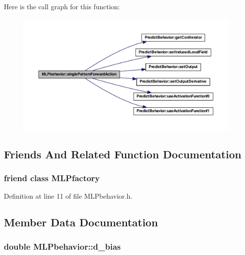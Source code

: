 Here is the call graph for this function:\nopagebreak
\begin{figure}[H]
\begin{center}
\leavevmode
\includegraphics[width=400pt]{class_m_l_pbehavior_a2f91bc3f2e558b92f5beb5e45402e6c7_cgraph}
\end{center}
\end{figure}




\subsection{Friends And Related Function Documentation}
\hypertarget{class_m_l_pbehavior_a1aa48940238b9487734e590ffab33a1b}{
\subsubsection[{MLPfactory}]{\setlength{\rightskip}{0pt plus 5cm}friend class {\bf MLPfactory}}}
\label{class_m_l_pbehavior_a1aa48940238b9487734e590ffab33a1b}


Definition at line 11 of file MLPbehavior.h.



\subsection{Member Data Documentation}
\hypertarget{class_m_l_pbehavior_a6206785c5c3f838a0538f9f77fa7a25a}{
\subsubsection[{d\_\-bias}]{\setlength{\rightskip}{0pt plus 5cm}double {\bf MLPbehavior::d\_\-bias}}}
\label{class_m_l_pbehavior_a6206785c5c3f838a0538f9f77fa7a25a}


